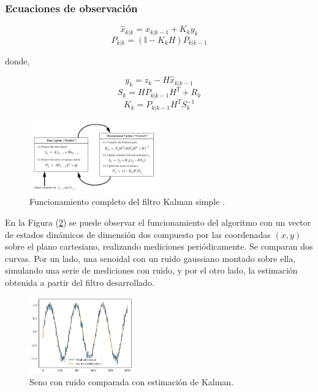\subsubsection{Ecuaciones de observación}

\begin{equation}
\hat{x}_{k|k} = \hat{x}_{k|k-1} + K_k y_k
\end{equation}
\begin{equation}
P_{k|k} = (\mathbb{I}-K_kH)P_{k|k-1}
\end{equation}

donde,

\begin{equation}
y_k = z_k - H\hat{x}_{k|k-1}
\end{equation}
\begin{equation}
S_k = HP_{k|k-1}H^T + R_k
\end{equation}
\begin{equation}
K_k = P_{k|k-1}H^TS_k^{-1}
\end{equation}

\begin{figure}[H]
		\centering
		\includegraphics[width=0.5\textwidth]{Imagenes/kalman1.png}
		\caption{Funcionamiento completo del filtro Kalman simple \cite{ref:kalman2}.}
		\label{fig:kalman1}
\end{figure}



 En la Figura (\ref{fig:kalman-comp}) se puede observar el funcionamiento del algoritmo con un vector de estados dinámicos de dimensión dos compuesto por las coordenadas $(x,y)$ sobre el plano cartesiano, realizando mediciones periódicamente. Se comparan dos curvas. Por un lado, una senoidal con un ruido gaussiano montado sobre ella, simulando una serie de mediciones con ruido, y por el otro lado, la estimación obtenida a partir del filtro desarrollado.

\begin{figure}[H]
\centering
	\includegraphics[width=0.4\textwidth]{Imagenes/Kalman_test_1.png}
	\caption{Seno con ruido comparada con estimación de Kalman.}
	\label{fig:kalman-comp}
\end{figure}

